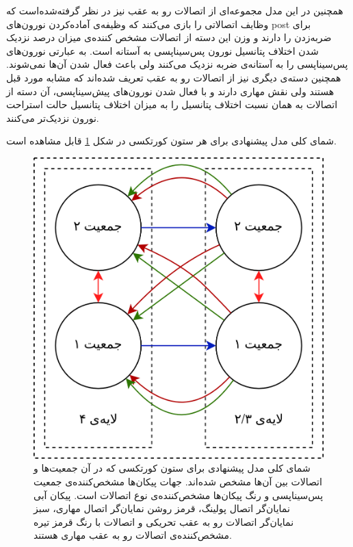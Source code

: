 \documentclass[12pt]{report}
\begin{document}
	همچنین در این مدل مجموعه‌ای از اتصالات رو به عقب نیز در نظر گرفته‌شده‌است که وظایف اتصالاتی را بازی می‌کنند که وظیفه‌ی آماده‌کردن نورون‌های \gls{post} برای ضربه‌زدن را دارند و وزن این دسته از اتصالات مشخص کننده‌ی میزان درصد نزدیک شدن اختلاف پتانسیل نورون پس‌سیناپسی به آستانه است. به عبارتی نورون‌های پس‌سیناپسی را به آستانه‌ی ضربه نزدیک می‌کنند ولی باعث فعال شدن آن‌ها نمی‌شوند. همچنین دسته‌ی دیگری نیز از اتصالات رو به عقب تعریف شده‌اند که مشابه مورد قبل هستند ولی نقش مهاری دارند و با فعال شدن نورون‌های پیش‌سیناپسی، آن دسته از اتصالات به همان نسبت اختلاف پتانسیل را به میزان اختلاف پتانسیل حالت استراحت نورون نزدیک‌تر می‌کنند.
	
	شمای کلی مدل پیشنهادی برای هر ستون کورتکسی در شکل \ref{fig:model_cc} قابل مشاهده است. 
	
	\begin{figure}[]
		\centering
		\includegraphics[width=1.0\linewidth]{model_cc.png}
		\caption[NS]{
			شمای کلی مدل پیشنهادی برای ستون کورتکسی که در آن جمعیت‌ها و اتصالات بین آن‌ها مشخص شده‌اند. جهات پیکان‌ها مشخص‌کننده‌ی جمعیت پس‌سیناپسی و رنگ پیکان‌ها مشخص‌کننده‌ی نوع اتصالات است. پیکان آبی نمایان‌گر اتصال پولینگ، قرمز روشن نمایان‌گر اتصال مهاری، سبز نمایان‌گر اتصالات رو به عقب تحریکی و  اتصالات با رنگ قرمز تیره مشخص‌کننده‌ی اتصالات رو به عقب مهاری هستند.
		}
		\label{fig:model_cc} 
	\end{figure}
	
\end{document}
